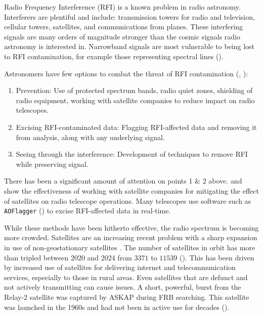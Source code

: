 \documentclass{pas}
\begin{document}
Radio Frequency Interference (RFI) is a known problem in radio astronomy.
Interferers are plentiful and include: transmission towers for radio and
television, cellular towers, satellites, and communications from planes.
These interfering signals are many orders of magnitude stronger than the
cosmic signals radio astronomy is interested in. Narrowband signals are most
vulnerable to being lost to RFI contamination, for example those
representing spectral lines (\cite{young_measurement_2025}).

Astronomers have few options to combat the threat of RFI contamination
(\cite{an_radio_2017},
\cite{baan_rfi_2011}): 

\begin{enumerate} 
  \item Prevention: Use of protected spectrum bands, radio quiet zones,
    shielding of radio equipment, working with satellite companies to reduce
    impact on radio telescopes. 

\item Excising RFI-contaminated data: Flagging RFI-affected data and removing
  it from analysis, along with any underlying signal. 

\item Seeing through the interference: Development of techniques to remove RFI while
  preserving signal.
\end{enumerate}

There has been a significant amount of attention on points 1 \& 2 above.
\cite{nhan_toward_2024} and \cite{nhan_ods_2025} show the effectiveness of
working with satellite companies for mitigating the effect of satellites on
radio telescope operations. Many telescopes use software such as
\texttt{AOFlagger} (\cite{offringa_interference_2023}) to excise
RFI-affected data in real-time.


While these methods have been hitherto effective, the radio spectrum is
becoming more crowded. Satellites are an increasing recent problem with a
sharp expansion in use of non-geostationary satellites
\cite{dai_impacts_2019}. The number of satellites in orbit has more than
tripled between 2020 and 2024 from $\num{3371}$ to $\num{11539}$
(\cite{satellite_industry_association_historic_2025}). This has been driven
by increased use of satellites for delivering internet and telecommunication
services, especially to those in rural areas. Even satellites that are
defunct and not actively transmitting can cause issues. A short, powerful,
burst from the Relay-2 satellite was captured by ASKAP during FRB searching.
This satellite was launched in the 1960s and had not been in active use for
decades (\cite{james_nanosecond-duration_2025}).
\end{document}
